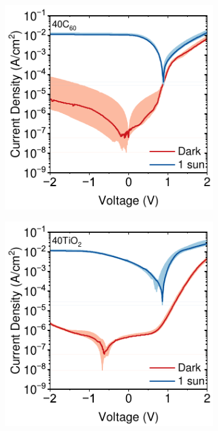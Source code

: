 



\begin{figure}[htbp]
    \centering

    \begin{subfigure}[b]{0.32\textwidth}
        \centering
        \includegraphics[width=\textwidth]{chapters/transport_layers/images/JV_Median_40C60.pdf}
        \caption{}
    \end{subfigure}
    \hfill
    \begin{subfigure}[b]{0.32\textwidth}
        \centering
        \includegraphics[width=\textwidth]{chapters/transport_layers/images/JV_Median_40TiO2.pdf}

\end{subfigure}
\end{figure}
